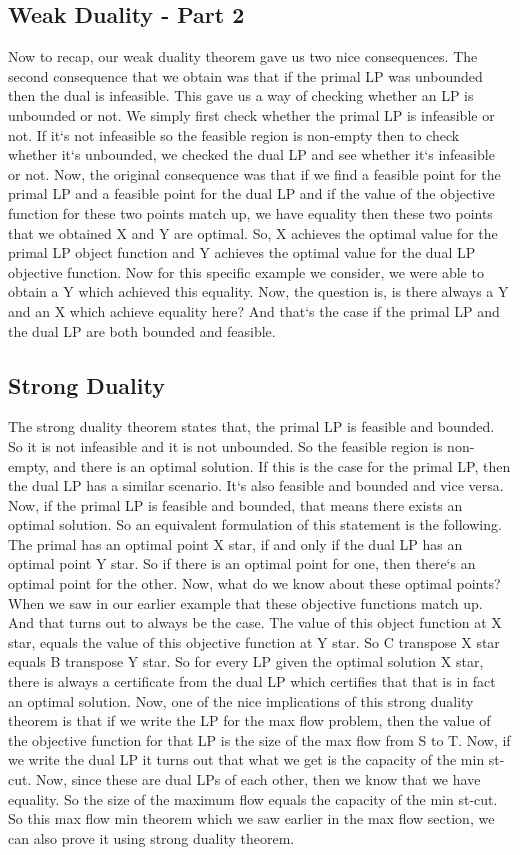 \subsection{Weak Duality - Part 2}
Now to recap, our weak duality theorem gave us two nice consequences.
The second consequence that we obtain was that if the primal LP was unbounded then the dual is infeasible.
This gave us a way of checking whether an LP is unbounded or not.
We simply first check whether the primal LP is infeasible or not.
If it`s not infeasible so the feasible region is non-empty then to check whether it`s unbounded, we checked the dual LP and see whether it`s infeasible or not.
Now, the original consequence was that if we find a feasible point for the primal LP and a feasible point for the dual LP and if the value of the objective function for these two points match up, we have equality then these two points that we obtained X and Y are optimal.
So, X achieves the optimal value for the primal LP object function and Y achieves the optimal value for the dual LP objective function.
Now for this specific example we consider, we were able to obtain a Y which achieved this equality.
Now, the question is, is there always a Y and an X which achieve equality here? And that`s the case if the primal LP and the dual LP are both bounded and feasible.

\subsection{Strong Duality}
The strong duality theorem states that, the primal LP is feasible and bounded.
So it is not infeasible and it is not unbounded.
So the feasible region is non-empty, and there is an optimal solution.
If this is the case for the primal LP, then the dual LP has a similar scenario.
It`s also feasible and bounded and vice versa.
Now, if the primal LP is feasible and bounded, that means there exists an optimal solution.
So an equivalent formulation of this statement is the following.
The primal has an optimal point X star, if and only if the dual LP has an optimal point Y star.
So if there is an optimal point for one, then there`s an optimal point for the other.
Now, what do we know about these optimal points? When we saw in our earlier example that these objective functions match up.
And that turns out to always be the case.
The value of this object function at X star, equals the value of this objective function at Y star.
So C transpose X star equals B transpose Y star.
So for every LP given the optimal solution X star, there is always a certificate from the dual LP which certifies that that is in fact an optimal solution.
Now, one of the nice implications of this strong duality theorem is that if we write the LP for the max flow problem, then the value of the objective function for that LP is the size of the max flow from S to T\@.
Now, if we write the dual LP it turns out that what we get is the capacity of the min st-cut.
Now, since these are dual LPs of each other, then we know that we have equality.
So the size of the maximum flow equals the capacity of the min st-cut.
So this max flow min theorem which we saw earlier in the max flow section, we can also prove it using strong duality theorem.

